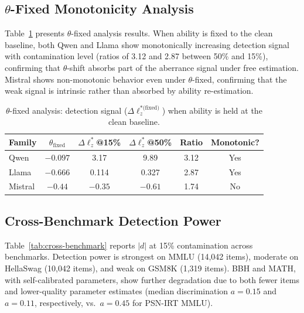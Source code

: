 \documentclass[11pt,a4paper]{article}
\begin{document}
\subsection{$\theta$-Fixed Monotonicity Analysis}

Table~\ref{tab:theta-fixed} presents $\theta$-fixed analysis results.
When ability is fixed to the clean baseline, both Qwen and Llama show monotonically increasing detection signal with contamination level (ratios of 3.12 and 2.87 between 50\% and 15\%), confirming that $\theta$-shift absorbs part of the aberrance signal under free estimation.
Mistral shows non-monotonic behavior even under $\theta$-fixed, confirming that the weak signal is intrinsic rather than absorbed by ability re-estimation.

\begin{table}[t]
\centering
\caption{$\theta$-fixed analysis: detection signal ($\Delta\ell_z^{*\text{(fixed)}}$) when ability is held at the clean baseline.}
\label{tab:theta-fixed}
\small
\begin{tabular}{lccccc}
\toprule
\textbf{Family} & \textbf{$\theta_{\text{fixed}}$} & \textbf{$\Delta\ell_z^{*}$@15\%} & \textbf{$\Delta\ell_z^{*}$@50\%} & \textbf{Ratio} & \textbf{Monotonic?} \\
\midrule
Qwen    & $-0.097$ & 3.17  & 9.89  & 3.12 & Yes \\
Llama   & $-0.666$ & 0.114 & 0.327 & 2.87 & Yes \\
Mistral & $-0.44$  & $-0.35$ & $-0.61$ & 1.74 & No \\
\bottomrule
\end{tabular}
\end{table}

\subsection{Cross-Benchmark Detection Power}
\label{sec:results-crossbench}

Table~\ref{tab:cross-benchmark} reports $|d|$ at 15\% contamination across benchmarks.
Detection power is strongest on MMLU (14,042 items), moderate on HellaSwag (10,042 items), and weak on GSM8K (1,319 items).
BBH and MATH, with self-calibrated parameters, show further degradation due to both fewer items and lower-quality parameter estimates (median discrimination $a=0.15$ and $a=0.11$, respectively, vs.\ $a=0.45$ for PSN-IRT MMLU).
\end{document}

